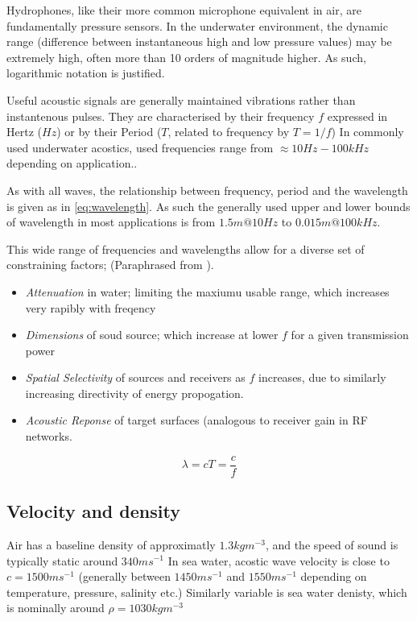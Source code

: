  Hydrophones, like their more common microphone equivalent in air, are fundamentally pressure sensors.
 In the underwater environment, the dynamic range (difference between instantaneous high and low pressure values) may be extremely high, often more than 10 orders of magnitude higher. 
 As such, logarithmic notation is justified.

 Useful acoustic signals are generally maintained vibrations rather than instantenous pulses.
 They are characterised by their frequency $f$ expressed in Hertz ($Hz$) or by their Period ($T$, related to frequency by $T=1/f$)
 In commonly used underwater acostics, used frequencies range from $\approx 10Hz-100kHz$ depending on application.\cite{Stojanovic2007}.

 As with all waves, the relationship between frequency, period and the wavelength is given as in \eqref{eq:wavelength}. 
 As such the generally used upper and lower bounds of wavelength in most applications is from $1.5 m @ 10Hz$ to $0.015m @ 100kHz$.

 This wide range of frequencies and wavelengths allow for a diverse set of constraining factors; (Paraphrased from \cite{lurton2010}).

 \begin{itemize}
   \item \emph{Attenuation} in water; limiting the maxiumu usable range, which increases very rapibly with freqency
   \item \emph{Dimensions} of soud source; which increase at lower $f$ for a given transmission power
   \item \emph{Spatial Selectivity} of sources and receivers as $f$ increases, due to similarly increasing directivity of energy propogation.
   \item \emph{Acoustic Reponse} of target surfaces (analogous to receiver gain in RF networks.
 \end{itemize}
 
 \begin{equation}
  \lambda = cT = \frac{c}{f}
  \label{eq:wavelength}
 \end{equation}


 \subsection{Velocity and density}

 Air has a baseline density of approximatly $1.3 kg m^{-3}$, and the speed of sound is typically static around $340 ms^{-1}$ 
 In sea water, acostic wave velocity is close to $c=1500ms^{-1}$ (generally between $1450ms^{-1}$ and $1550ms^{-1}$ depending on temperature, pressure, salinity etc.)
 Similarly variable is sea water denisty, which is nominally around $\rho = 1030kg m^{-3}$


